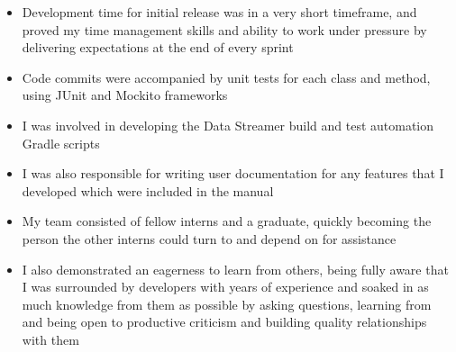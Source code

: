 \documentclass[10pt,a4paper,sans]{moderncv}        %
\begin{document}
{\begin{itemize}
\begin{itemize}
	\item Development time for initial release was in a very short timeframe, and proved my time management skills and ability to work under pressure by delivering expectations at the end of every sprint
	\item Code commits were accompanied by unit tests for each class and method, using JUnit and Mockito frameworks
	\item I was involved in developing the Data Streamer build and test automation Gradle scripts
	\item I was also responsible for writing user documentation for any features that I developed which were included in the manual
	\item My team consisted of fellow interns and a graduate, quickly becoming the person the other interns could turn to and depend on for assistance
	\item I also demonstrated an eagerness to learn from others, being fully aware that I was surrounded by developers with years of experience and soaked in as much knowledge from them as possible by asking questions, learning from and being open to productive criticism and building quality relationships with them
	\end{itemize}
\end{itemize}}
\end{document}
